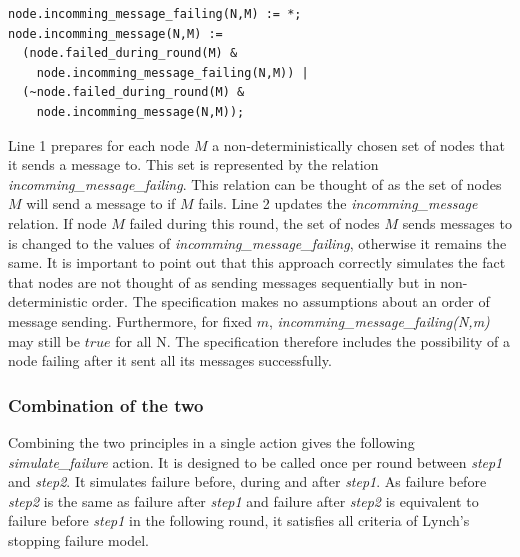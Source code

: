 \documentclass[fleqn]{article}
\begin{document}
\begin{mdframed}[nobreak=true, backgroundcolor=light-gray, roundcorner=10pt,leftmargin=1, rightmargin=1, innerleftmargin=15, innertopmargin=15,innerbottommargin=15, outerlinewidth=1, linecolor=light-gray]
\begin{lstlisting}
node.incomming_message_failing(N,M) := *;
node.incomming_message(N,M) :=
  (node.failed_during_round(M) &
    node.incomming_message_failing(N,M)) |
  (~node.failed_during_round(M) &
    node.incomming_message(N,M));
\end{lstlisting}
\end{mdframed}

Line 1 prepares for each node $M$ a non-deterministically chosen set of nodes that it sends a message to. This set is represented by the relation \textit{incomming\_message\_failing}. This relation can be thought of as the set of nodes $M$ will send a message to if $M$ fails.
Line 2 updates the \textit{incomming\_message} relation. If node $M$ failed during this round, the set of nodes
 $M$ sends messages to is changed to the values of \textit{incomming\_message\_failing}, otherwise it remains the same. It is important to point out that this approach correctly simulates the fact that nodes are not thought of as sending messages sequentially but in non-deterministic order. The specification makes no assumptions about an order of message sending. Furthermore, for fixed $m$, \textit{incomming\_message\_failing(N,m)} may still be $true$ for all N. The specification therefore includes the possibility of a node failing after it sent all its messages successfully.

\subsubsection{Combination of the two}
Combining the two principles in a single action gives the following \textit{simulate\_failure} action. It is designed to be called once per round between \textit{step1} and \textit{step2}. It simulates failure before, during and after \textit{step1}. As failure before \textit{step2} is the same as failure after \textit{step1} and failure after \textit{step2} is equivalent to failure before \textit{step1} in the following round, it satisfies all criteria of Lynch's \cite{refNancy} stopping failure model.
\end{document}
